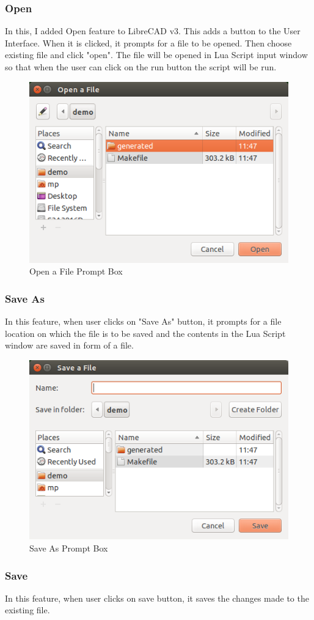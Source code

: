 \subsubsection{Open}
In this, I added Open feature to LibreCAD v3. This adds a button to the User Interface. When it is clicked, it prompts for a file to be opened. Then choose existing file and click "open". The file will be opened in Lua Script input window so that when the user can click on the run button the script will be run.\\
\begin{figure}[!ht]
\centering
\includegraphics[scale=0.5]{images/open.png}
\caption{Open a File Prompt Box}
\end{figure}

\subsubsection{Save As}
In this feature, when user clicks on "Save As" button, it prompts for a file location on which the file is to be saved and the contents in the Lua Script window are saved in form of a file.
\begin{figure}[!ht]
\centering
\includegraphics[scale=0.5]{images/save.png}
\caption{Save As Prompt Box}
\end{figure}

\subsubsection{Save}
In this feature, when user clicks on save button, it saves the changes made to the existing file.

